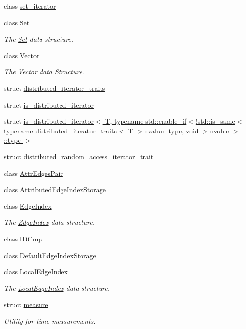 \begin{DoxyCompactItemize}
class \hyperlink{classshad_1_1set__iterator}{set\-\_\-iterator}
\item 
class \hyperlink{classshad_1_1Set}{Set}
\begin{DoxyCompactList}\small\item\em The \hyperlink{classshad_1_1Set}{Set} data structure. \end{DoxyCompactList}\item 
class \hyperlink{classshad_1_1Vector}{Vector}
\begin{DoxyCompactList}\small\item\em The \hyperlink{classshad_1_1Vector}{Vector} data Structure. \end{DoxyCompactList}\item 
struct \hyperlink{structshad_1_1distributed__iterator__traits}{distributed\-\_\-iterator\-\_\-traits}
\item 
struct \hyperlink{structshad_1_1is__distributed__iterator}{is\-\_\-distributed\-\_\-iterator}
\item 
struct \hyperlink{structshad_1_1is__distributed__iterator_3_01T_00_01typename_01std_1_1enable__if_3_9std_1_1is__sa51db7b1d56bd82f65c31391ac3bbe077}{is\-\_\-distributed\-\_\-iterator$<$ T, typename std\-::enable\-\_\-if$<$!std\-::is\-\_\-same$<$ typename distributed\-\_\-iterator\-\_\-traits$<$ T $>$\-::value\-\_\-type, void $>$\-::value $>$\-::type $>$}
\item 
struct \hyperlink{structshad_1_1distributed__random__access__iterator__trait}{distributed\-\_\-random\-\_\-access\-\_\-iterator\-\_\-trait}
\item 
class \hyperlink{classshad_1_1AttrEdgesPair}{Attr\-Edges\-Pair}
\item 
class \hyperlink{classshad_1_1AttributedEdgeIndexStorage}{Attributed\-Edge\-Index\-Storage}
\item 
class \hyperlink{classshad_1_1EdgeIndex}{Edge\-Index}
\begin{DoxyCompactList}\small\item\em The \hyperlink{classshad_1_1EdgeIndex}{Edge\-Index} data structure. \end{DoxyCompactList}\item 
class \hyperlink{classshad_1_1IDCmp}{I\-D\-Cmp}
\item 
class \hyperlink{classshad_1_1DefaultEdgeIndexStorage}{Default\-Edge\-Index\-Storage}
\item 
class \hyperlink{classshad_1_1LocalEdgeIndex}{Local\-Edge\-Index}
\begin{DoxyCompactList}\small\item\em The \hyperlink{classshad_1_1LocalEdgeIndex}{Local\-Edge\-Index} data structure. \end{DoxyCompactList}\item 
struct \hyperlink{structshad_1_1measure}{measure}
\begin{DoxyCompactList}\small\item\em Utility for time measurements. \end{DoxyCompactList}\end{DoxyCompactItemize}
